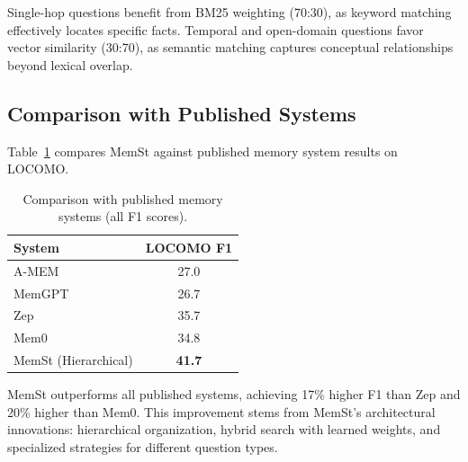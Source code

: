 \begin{table}[ht]
\centering
\caption{Effect of RRF weights on different question categories.}
\label{tab:rrf_weights}
\end{table}

Single-hop questions benefit from BM25 weighting (70:30), as keyword matching effectively locates specific facts. Temporal and open-domain questions favor vector similarity (30:70), as semantic matching captures conceptual relationships beyond lexical overlap.

\subsection{Comparison with Published Systems}

Table~\ref{tab:comparison} compares MemSt against published memory system results on LOCOMO.

\begin{table}[ht]
\centering
\caption{Comparison with published memory systems (all F1 scores).}
\label{tab:comparison}
\begin{tabular}{@{}lc@{}}
\toprule
\textbf{System} & \textbf{LOCOMO F1} \\
\midrule
A-MEM \citep{xu2025mem} & 27.0 \\
MemGPT \citep{packer2023memgpt} & 26.7 \\
Zep \citep{rasmussen2025zep} & 35.7 \\
Mem0 \citep{chhikara2025mem0} & 34.8 \\
\midrule
MemSt (Hierarchical) & \textbf{41.7} \\
\bottomrule
\end{tabular}
\end{table}

MemSt outperforms all published systems, achieving 17\% higher F1 than Zep and 20\% higher than Mem0. This improvement stems from MemSt's architectural innovations: hierarchical organization, hybrid search with learned weights, and specialized strategies for different question types.

